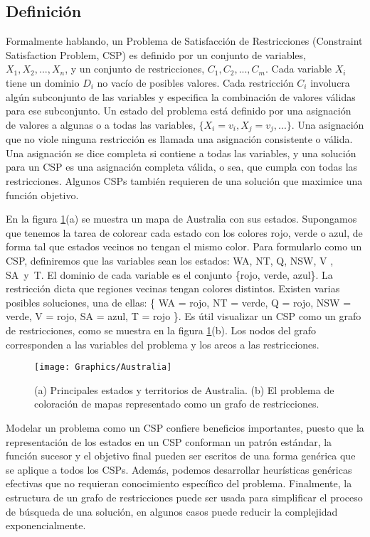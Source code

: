 \subsection{Definición}

Formalmente hablando, un Problema de Satisfacción de Restricciones (Constraint Satisfaction Problem, CSP) es definido por un conjunto de variables, $X_{1},X_{2},...,X_{n}$, y un conjunto de restricciones, $C_{1},C_{2},...,C_{m}$. Cada variable $X_{i}$ tiene un dominio $D_{i}$ no vac\'io de posibles valores. Cada restricción $C_{i}$ involucra algún subconjunto de las variables y especifica la combinación de valores válidas para ese subconjunto. Un estado del problema está definido por una asignación de valores a algunas o a todas las variables, $\{X_{i}=v_{i}, X_{j}=v_{j}, ...\}$. Una asignación que no viole ninguna restricción es llamada una asignación consistente o válida. Una asignación se dice completa si contiene a todas las variables, y una solución para un CSP es una asignación completa válida, o sea, que cumpla con todas las restricciones. Algunos CSPs tambi\'en requieren de una solución que maximice una función objetivo.

En la figura \ref{Australia}(a) se muestra un mapa de Australia con sus estados. Supongamos que tenemos la tarea de colorear cada estado con los colores rojo, verde o azul, de forma tal que estados vecinos no tengan el mismo color. Para formularlo como un CSP, definiremos que las variables sean los estados: WA, NT, Q, NSW, V , SA\ y\ T. El dominio de cada variable  es el conjunto \{rojo, verde, azul\}. La restricción dicta que regiones vecinas tengan colores distintos. Existen varias posibles soluciones, una de ellas: \{ WA = rojo, NT = verde, Q = rojo, NSW = verde, V = rojo, SA = azul, T = rojo \}. Es útil visualizar un CSP como un grafo de restricciones, como se muestra en la figura \ref{Australia}(b). Los nodos del grafo corresponden a las variables del problema y los arcos a las restricciones.

\begin{figure}
	\begin{center}
		\texttt{[image: Graphics/Australia]}
		\caption{(a) Principales estados y territorios de Australia. (b) El problema de coloración de mapas representado como un grafo de restricciones.}
		\label{Australia}
	\end{center}	
\end{figure}

Modelar un problema como un CSP confiere beneficios importantes, puesto que la representación de los estados en un CSP
conforman un patrón estándar, la función sucesor y el objetivo final pueden ser escritos de una forma gen\'erica que se aplique a todos los CSPs. Adem\'as, podemos desarrollar heur\'isticas gen\'ericas efectivas que no requieran conocimiento espec\'ifico del problema. Finalmente, la estructura de un grafo de restricciones puede ser usada para simplificar el proceso de búsqueda de una solución, en algunos casos puede reducir la complejidad exponencialmente.


